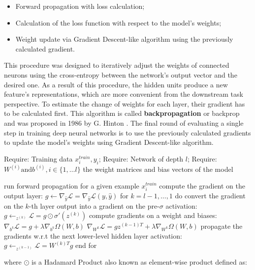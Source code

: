 \begin{itemize}
    \item Forward propagation with loss calculation;
    \item Calculation of the loss function with respect to the model's weights;
    \item Weight update via Gradient Descent-like algorithm using the previously calculated gradient.
\end{itemize}

This procedure was designed to iteratively adjust the weights of connected neurons using the cross-entropy between the network's output vector and the desired one. As a result of this procedure, the hidden units produce a new feature's representations, which are more convenient from the downstream task perspective.  To estimate the change of weights for each layer, their gradient has to be calculated first. This algorithm is called \textbf{backpropagation} or backprop and was proposed in 1986 by G. Hinton \cite{backprop}. 
The final round of evaluating a single step in training deep neural networks is to use the previously calculated gradients to update the model's weights using Gradient Descent-like algorithm. 

\begin{algorithm}[caption={Backward propagation of feed-forward neural network }, label={alg:backward_prop}]
Require: Training data ${x^{train}_{i} , y_{i}}$;
Require: Network of depth $l$;
Require: $W^{(i)} \textrm{and}  b^{(i)}, i \in \{ 1, \ldots l \}$ the weight matrices and bias vectors of the model

run forward propagation for a given example $x^{train}_{i}$
compute the gradient on the output layer: 
$g \leftarrow \nabla_{\hat{y}} \mathcal{L} =  \nabla_{\hat{y}} \mathcal{L}(y, \hat{y})$ 
for $k = l-1, \ldots, 1$ do
   convert the gradient on the $k$-th layer output into a gradient on the pre-$\sigma$ activation: 
   $g \leftarrow_{z^{(k)}} \mathcal{L} = g \odot \sigma'(z^{(k)})$
   compute gradients on a weight and biases:
   $\nabla_{b^{k}} \mathcal{L}  = g + \lambda \nabla_{b^{k}} \Omega(W, b) $ 
   $\nabla_{W^{k}} \mathcal{L}  = g z^{(k-1)T} + \lambda \nabla_{W^{k}} \Omega(W, b) $ 
   propagate the gradients w.r.t the next lower-level hidden layer activation:
   $g \leftarrow_{z^{(k-1)}} \mathcal{L} = W^{(k)T}g$
end for
\end{algorithm}

where $\odot$ is a Hadamard Product also known as element-wise product defined as:

